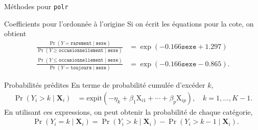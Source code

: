 \documentclass[
  ignorenonframetext,
]{beamer}
\newenvironment{Shaded}{\begin{snugshade}}{\end{snugshade}}
\newcommand{\CommentTok}[1]{\textcolor[rgb]{0.37,0.37,0.37}{#1}}
\newcommand{\FunctionTok}[1]{\textcolor[rgb]{0.28,0.35,0.67}{#1}}
\newcommand{\NormalTok}[1]{\textcolor[rgb]{0.00,0.23,0.31}{#1}}
\newcommand{\SpecialCharTok}[1]{\textcolor[rgb]{0.37,0.37,0.37}{#1}}
\begin{document}
\begin{frame}[fragile]{Méthodes pour \texttt{polr}}
\protect\hypertarget{muxe9thodes-pour-polr}{}
\begin{Shaded}
\end{Shaded}
\end{frame}

\begin{frame}{Coefficients pour l'ordonnée à l'origine}
\protect\hypertarget{coefficients-pour-lordonnuxe9e-uxe0-lorigine}{}
Si on écrit les équations pour la cote, on obtient \begin{align*}
\frac{\Pr(Y = \texttt{rarement} \mid \texttt{sexe})}{\Pr(Y \geq \texttt{occasionnellement} \mid \texttt{sexe})} &= \exp(-0.166\texttt{sexe} + 1.297) \\ 
\frac{\Pr(Y \leq \texttt{occasionnellement} \mid \texttt{sexe})}{\Pr(Y = \texttt{toujours} \mid \texttt{sexe})} &= \exp(-0.166\texttt{sexe} - 0.865).
\end{align*}
\end{frame}

\begin{frame}{Probabilités prédites}
\protect\hypertarget{probabilituxe9s-pruxe9dites}{}
En terme de probabilité cumulée d'excéder \(k\), \begin{align*}
\Pr(Y_i > k \mid \mathbf{X}_i) &= \textrm{expit}(-\eta_k + \beta_1 \mathrm{X}_{i1} + \cdots + \beta_p \mathrm{X}_{ip}), \quad k=1, \ldots, K-1.
\end{align*} En utilisant ces expressions, on peut obtenir la
probabilité de chaque catégorie, \begin{align*}
&\Pr(Y_i = k \mid \mathbf{X}_{i}) =\Pr(Y_i > k \mid \mathbf{X}_{i}) - \Pr(Y_i > k-1 \mid \mathbf{X}_{i}).
\end{align*}
\end{frame}
\end{document}
